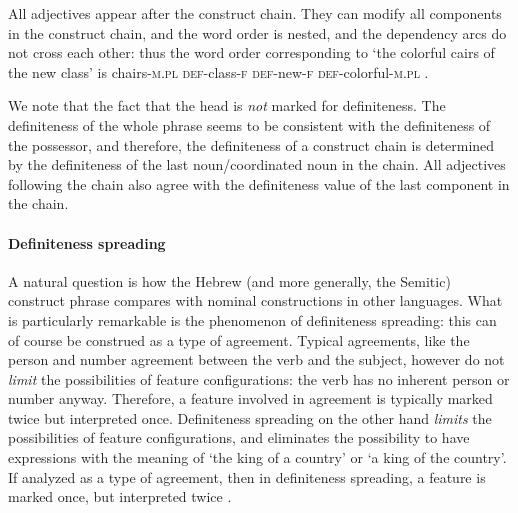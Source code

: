 \documentclass[a4paper, oneside, 12pt]{report}
\newcommand{\category}[1]{\textsc{#1}}
\newcommand{\translate}[1]{`#1'}
\begin{document}
All adjectives appear after the construct chain.
They can modify all components in the construct chain,
and the word order is nested,
and the dependency arcs do not cross each other:
thus the word order corresponding to \translate{the colorful cairs of the new class}
is chairs-\category{m.pl} \category{def}-class-\category{f} \category{def}-new-\category{f} \category{def}-colorful-\category{m.pl}
\citep{borer1999deconstructing}.

We note that the fact that the head is \emph{not} marked for definiteness.
The definiteness of the whole phrase seems to be consistent with the definiteness of the possessor,
and therefore, the definiteness of a construct chain 
is determined by the definiteness of the last noun/coordinated noun in the chain.
All adjectives following the chain also agree with the definiteness value 
of the last component in the chain.

\paragraph*{Definiteness spreading}
A natural question is how the Hebrew (and more generally, the Semitic) construct phrase
compares with nominal constructions in other languages.
What is particularly remarkable is the phenomenon of definiteness spreading:
this can of course be construed as a type of agreement.
Typical agreements, like the person and number agreement between the verb and the subject,
however do not \emph{limit} the possibilities of feature configurations:
the verb has no inherent person or number anyway.
Therefore, a feature involved in agreement is typically marked twice but interpreted once.
Definiteness spreading on the other hand \emph{limits} the possibilities of feature configurations,
and eliminates the possibility to have expressions with the meaning of 
\translate{the king of a country} or \translate{a king of the country}.
If analyzed as a type of agreement,
then in definiteness spreading, a feature is marked once,
but interpreted twice \citep{dobrovie2000definiteness}.
\end{document}
